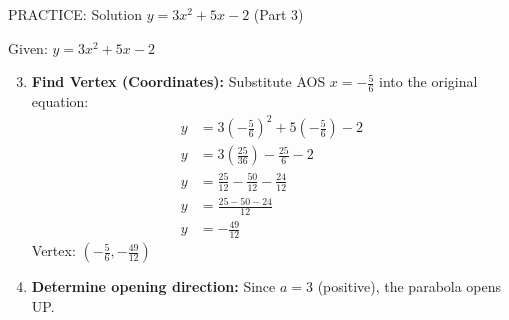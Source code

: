 \documentclass[aspectratio=169]{beamer}
\begin{document}
\begin{frame}{PRACTICE: Solution $y = 3x^2 + 5x - 2$ (Part 3)}
    \begin{tcolorbox}[colback=lightgray,colframe=accent,title=Detailed Solution (Cont.)]
        \footnotesize
        Given: $y = 3x^2 + 5x - 2$
        
        \begin{enumerate}
            \setcounter{enumi}{2}
            \item \textbf{Find Vertex (Coordinates):}
            Substitute AOS $x=-\frac{5}{6}$ into the original equation:
            \begin{align*}
                y &= 3(-\frac{5}{6})^2 + 5(-\frac{5}{6}) - 2 \\
                y &= 3(\frac{25}{36}) - \frac{25}{6} - 2 \\
                y &= \frac{25}{12} - \frac{50}{12} - \frac{24}{12} \\
                y &= \frac{25 - 50 - 24}{12} \\
                y &= -\frac{49}{12}
            \end{align*}
            Vertex: $(-\frac{5}{6}, -\frac{49}{12})$
            
            \item \textbf{Determine opening direction:}
            Since $a=3$ (positive), the parabola opens UP.
        \end{enumerate}
    \end{tcolorbox}
\end{frame}
\end{document}
